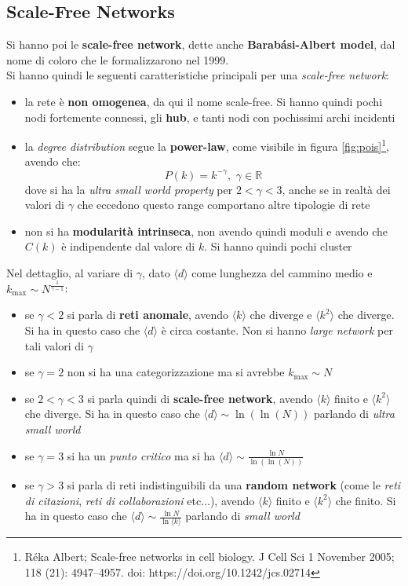 \documentclass[a4paper,12pt, oneside]{book}
\begin{document}
\subsection{Scale-Free Networks}
Si hanno poi le \textbf{scale-free network}, dette anche \textbf{Barabási-Albert
  model}, dal nome di coloro che le formalizzarono nel 1999.\\
Si hanno quindi le seguenti caratteristiche principali per una
\textit{scale-free network}:
\begin{itemize}
  \item la rete è \textbf{non omogenea}, da qui il nome scale-free. Si hanno
  quindi pochi nodi fortemente connessi, gli \textbf{hub}, e tanti nodi con
  pochissimi archi incidenti
  \item la \textit{degree distribution} segue la \textbf{power-law}, come
  visibile in figura \ref{fig:pois}\footnote{Réka Albert; Scale-free 
    networks in cell biology. J Cell Sci 1 November 2005; 118 (21):
    4947–4957. doi: https://doi.org/10.1242/jcs.02714}, avendo che: 
  \[P(k)=k^{-\gamma},\,\,\gamma\in\mathbb{R}\]
  dove si ha la \textit{ultra small world property} per $2<\gamma<3$, anche se
  in realtà dei valori di $\gamma$ che eccedono questo range comportano altre
  tipologie di rete
  \item non si ha \textbf{modularità intrinseca}, non avendo quindi moduli e
  avendo che $C(k)$ è indipendente dal valore di $k$. Si hanno quindi pochi
  cluster 
\end{itemize}
Nel dettaglio, al variare di $\gamma$, dato $\langle d\rangle$ come lunghezza
del cammino medio e $k_{\max}\sim N^{\frac{1}{\gamma -1}}$:
\begin{itemize}
  \item se $\gamma<2$ si parla di \textbf{reti anomale}, avendo
  $\langle k\rangle$ che diverge e $\langle k^2\rangle$ che diverge. Si ha in
  questo caso che $\langle d\rangle$ è circa costante. Non si hanno
  \textit{large network} per tali valori di $\gamma$
  \item se $\gamma = 2$ non si ha una categorizzazione ma si avrebbe
  $k_{\max}\sim N$ 
  \item se $2<\gamma<3$ si parla quindi di \textbf{scale-free network}, avendo
  $\langle k\rangle$ finito e $\langle k^2\rangle$ che diverge. Si ha in
  questo caso che $\langle d\rangle\sim\ln(\ln(N))$ parlando di \textit{ultra
    small world}
  \item se $\gamma = 3$ si ha un \textit{punto critico} ma si ha $\langle
  d\rangle\sim\frac{\ln N}{\ln(\ln(N))}$
  \item se $\gamma>3$ si parla di reti indistinguibili da una \textbf{random
    network} (come le \textit{reti di citazioni}, \textit{reti di
    collaborazioni} etc$\ldots$), avendo 
  $\langle k\rangle$ finito e $\langle k^2\rangle$ che finito. Si ha in
  questo caso che $\langle d\rangle\sim\frac{\ln N}{\ln\langle k\rangle}$
  parlando di \textit{small world} 
\end{itemize}
\end{document}
